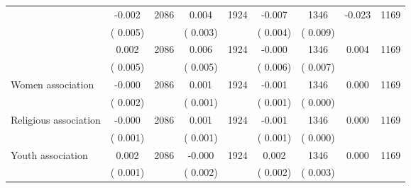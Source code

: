 \begin{tabular}{l*{8}{c}}
        &             -0.002      &       2086       &              0.004      &       1924       &             -0.007      &       1346  &       -0.023 &       1169       \\
                       &       (       0.005)            &                               &       (       0.003)            &                               &       (       0.004)            &       (       0.009) &                  \\
        &              0.002      &       2086       &              0.006      &       1924       &             -0.000      &       1346  &        0.004 &       1169       \\
                       &       (       0.005)            &                               &       (       0.005)            &                               &       (       0.006)            &       (       0.007) &                  \\
Women association        &             -0.000      &       2086       &              0.001      &       1924       &             -0.001      &       1346  &        0.000 &       1169       \\
                       &       (       0.002)            &                               &       (       0.001)            &                               &       (       0.001)            &       (       0.000) &                  \\
Religious association        &             -0.000      &       2086       &              0.001      &       1924       &             -0.001      &       1346  &        0.000 &       1169       \\
                       &       (       0.001)            &                               &       (       0.001)            &                               &       (       0.001)            &       (       0.000) &                  \\
Youth association        &              0.002      &       2086       &             -0.000      &       1924       &              0.002      &       1346  &        0.000 &       1169       \\
                       &       (       0.001)            &                               &       (       0.002)            &                               &       (       0.002)            &       (       0.003) &                  \\
\hline \end{tabular}